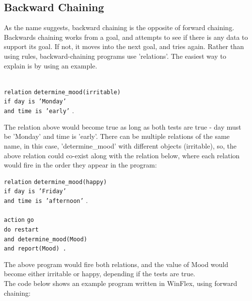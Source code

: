 \documentclass[12pt]{report}
\begin{document}
\subsection{Backward Chaining}\label{subsec:backward_chaining}
As the name suggests, backward chaining is the opposite of forward chaining.  Backwards chaining works from a goal, and attempts to see if there is any data to support its goal.  If not, it moves into the next goal, and tries again.  Rather than using rules, backward-chaining programs use 'relations'.  The easiest way to explain is by using an example.\\
\\
\begin{tabbing}
	\texttt{relation} \= \texttt{determine\_mood(irritable)}\\
	\> \texttt{if day is 'Monday'}\\
	\> \texttt{and time is 'early'} .\\
\end{tabbing}
The relation above would become true as long as both tests are true - day must be 'Monday' and time is 'early'.  There can be multiple relations of the same name, in this case, 'determine\_mood' with different objects (irritable), so, the above relation could co-exist along with the relation below, where each relation would fire in the order they appear in the program:
\begin{tabbing}
	\texttt{relation} \= \texttt{determine\_mood(happy)}\\
	\> \texttt{if day is 'Friday'}\\
	\> \texttt{and time is 'afternoon'} .\\
	\\
	\texttt{action} \= \texttt{go}\\
	\> \texttt{do restart}\\
	\> \texttt{and determine\_mood(Mood)}\\
	\> \texttt{and report(Mood) .}\\
\end{tabbing}
The above program would fire both relations, and the value of Mood would become either irritable or happy, depending if the tests are true.\\
The code below shows an example program written in WinFlex, using forward chaining:
\end{document}
